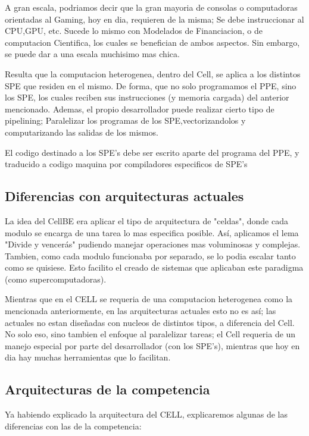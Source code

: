 \documentclass[10pt,compsoc]{IEEEtran}
\begin{document}
	A gran escala, podriamos decir que la gran mayoria de consolas o computadoras orientadas al Gaming, hoy en dia, requieren de la misma; Se debe instruccionar al CPU,GPU, etc. Sucede lo mismo con Modelados de Financiacion, o de computacion Cientifica, los cuales se benefician de ambos aspectos. Sin embargo, se puede dar a una escala muchisimo mas chica.\newline
	
	 Resulta que la computacion heterogenea, dentro del Cell, se aplica a los distintos SPE que residen en el mismo. De forma, que no solo programamos el PPE, sino los SPE, los cuales reciben sus instrucciones (y memoria cargada) del anterior mencionado. Ademas, el propio desarrollador puede realizar cierto tipo de pipelining; Paralelizar los programas de los SPE,vectorizandolos y computarizando las salidas de los mismos.\newline
	 
	 El codigo destinado a los SPE's debe ser escrito aparte del programa del PPE, y traducido a codigo maquina por compiladores especificos de SPE's
	
	\subsection{Diferencias con arquitecturas actuales}
	\noindent La idea del CellBE era aplicar el tipo de arquitectura de "celdas", donde cada modulo se encarga de una tarea lo mas especifica posible. Así, aplicamos el lema "Divide y vencerás" pudiendo manejar operaciones mas voluminosas y complejas. Tambien, como cada modulo funcionaba por separado, se lo podia escalar tanto como se quisiese. Esto facilito el creado de sistemas que aplicaban este paradigma (como supercomputadoras).\newline
	
	 Mientras que en el CELL se requeria de una computacion heterogenea como la mencionada anteriormente, en las arquitecturas actuales esto no es así; las actuales no estan diseñadas con nucleos de distintos tipos, a diferencia del Cell. No solo eso, sino tambien el enfoque al paralelizar tareas; el Cell requeria de un manejo especial por parte del desarrollador (con los SPE's), mientras que hoy en dia hay muchas herramientas que lo facilitan.
	
	\subsection{Arquitecturas de la competencia}%
	\noindent Ya habiendo explicado la arquitectura del CELL, explicaremos algunas de las diferencias con las de la competencia:
	
\end{document}
